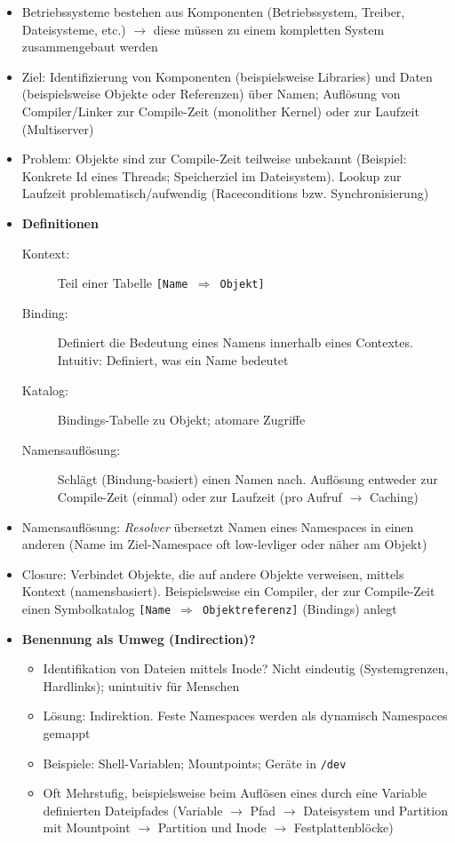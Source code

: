 \begin{itemize}
	\item Betriebssysteme bestehen aus Komponenten (Betriebssystem, Treiber, Dateisysteme, etc.) \(\rightarrow\) diese müssen zu einem kompletten System zusammengebaut werden
	\item Ziel: Identifizierung von Komponenten (beispielsweise Libraries) und Daten (beispielsweise Objekte oder Referenzen) über Namen; Auflösung von Compiler/Linker zur Compile-Zeit (monolither Kernel) oder zur Laufzeit (Multiserver)
	\item Problem: Objekte sind zur Compile-Zeit teilweise unbekannt (Beispiel: Konkrete Id eines Threads; Speicherziel im Dateisystem). Lookup zur Laufzeit problematisch/aufwendig (Raceconditions bzw. Synchronisierung)
	\item \textbf{Definitionen}
	\begin{description}
		\item[Kontext:] Teil einer Tabelle \texttt{[Name \(\Rightarrow\) Objekt]}
		\item[Binding:] Definiert die Bedeutung eines Namens innerhalb eines Contextes. Intuitiv: Definiert, was ein Name bedeutet
		\item[Katalog:] Bindings-Tabelle zu Objekt; atomare Zugriffe
		\item[Namensauflösung:] Schlägt (Bindung-basiert) einen Namen nach. Auflösung entweder zur Compile-Zeit (einmal) oder zur Laufzeit (pro Aufruf \(\rightarrow\) Caching)
	\end{description}
	\item Namensauflösung: \textit{Resolver} übersetzt Namen eines Namespaces in einen anderen (Name im Ziel-Namespace oft low-levliger oder näher am Objekt)
	\item Closure: Verbindet Objekte, die auf andere Objekte verweisen, mittels Kontext (namensbasiert). Beispielsweise ein Compiler, der zur Compile-Zeit einen Symbolkatalog \texttt{[Name \(\Rightarrow\) Objektreferenz]} (Bindings) anlegt
	\item \textbf{Benennung als Umweg (Indirection)?}
	\begin{itemize}
		\item Identifikation von Dateien mittels Inode? Nicht eindeutig (Systemgrenzen, Hardlinks); unintuitiv für Menschen
		\item Lösung: Indirektion. Feste Namespaces werden als dynamisch Namespaces gemappt
		\item Beispiele: Shell-Variablen; Mountpoints; Geräte in \texttt{/dev}
		\item Oft Mehrstufig, beispielsweise beim Auflösen eines durch eine Variable definierten Dateipfades (Variable \(\rightarrow\) Pfad \(\rightarrow\) Dateisystem und Partition mit Mountpoint \(\rightarrow\) Partition und Inode \(\rightarrow\) Festplattenblöcke)

\end{itemize}
\end{itemize}
